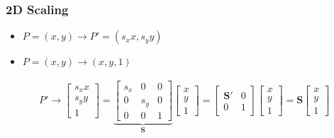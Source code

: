 \documentclass[letterpaper,12pt]{article}
\newcommand{\lra}{\ensuremath{\longrightarrow{}}}
\newcommand{\matr}[1]{\mathbf{#1}}
\begin{document}
\subsubsection{2D Scaling}
\begin{itemize}
 \item $P=(x,y) \lra P'=(s_x x, s_y y)$
 \item $P=(x,y) \lra (x,y,1)$
\end{itemize}
\begin{align}
 P' \lra \begin{bmatrix}
  s_x x \\
  s_y y \\
  1
 \end{bmatrix}
 = \underbrace{\begin{bmatrix}
   s_x & 0   & 0 \\
   0   & s_y & 0 \\
   0   & 0   & 1
  \end{bmatrix}}_\matr{S}
 \begin{bmatrix}
  x \\
  y \\
  1
 \end{bmatrix}
 = \begin{bmatrix}
  \matr{S}' & 0 \\
  0         & 1
 \end{bmatrix}
 \begin{bmatrix}
  x \\
  y \\
  1
 \end{bmatrix}
 = \matr{S}
 \begin{bmatrix}
  x \\
  y \\
  1
 \end{bmatrix}
\end{align}
\end{document}
